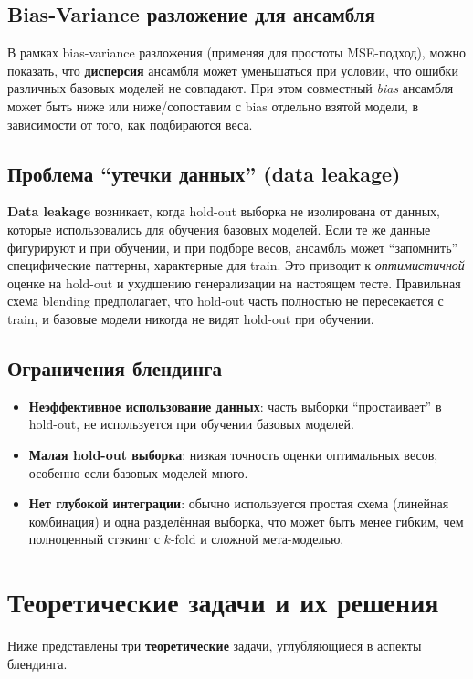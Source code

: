 \subsection{Bias-Variance разложение для ансамбля}
В рамках bias-variance разложения (применяя для простоты MSE-подход), можно показать, что \textbf{дисперсия} ансамбля может уменьшаться при условии, что ошибки различных базовых моделей не совпадают. При этом совместный \textit{bias} ансамбля может быть ниже или ниже/сопоставим с bias отдельно взятой модели, в зависимости от того, как подбираются веса. 

\subsection{Проблема ``утечки данных'' (data leakage)}
\textbf{Data leakage} возникает, когда hold-out выборка не изолирована от данных, которые использовались для обучения базовых моделей. Если те же данные фигурируют и при обучении, и при подборе весов, ансамбль может ``запомнить'' специфические паттерны, характерные для train. Это приводит к \textit{оптимистичной} оценке на hold-out и ухудшению генерализации на настоящем тесте. Правильная схема blending предполагает, что hold-out часть полностью не пересекается с train, и базовые модели никогда не видят hold-out при обучении.

\subsection{Ограничения блендинга}
\begin{itemize}
    \item \textbf{Неэффективное использование данных}: часть выборки ``простаивает'' в hold-out, не используется при обучении базовых моделей.
    \item \textbf{Малая hold-out выборка}: низкая точность оценки оптимальных весов, особенно если базовых моделей много.
    \item \textbf{Нет глубокой интеграции}: обычно используется простая схема (линейная комбинация) и одна разделённая выборка, что может быть менее гибким, чем полноценный стэкинг с $k$-fold и сложной мета-моделью.
\end{itemize}

\section{Теоретические задачи и их решения}

Ниже представлены три \textbf{теоретические} задачи, углубляющиеся в аспекты блендинга.

